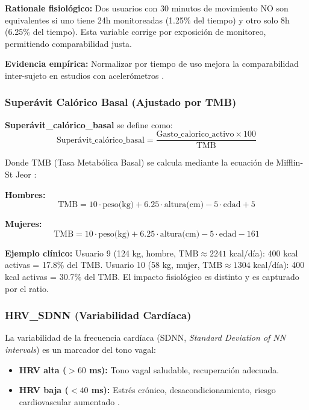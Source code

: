 \documentclass[12pt,a4paper,twoside]{article}
\newcommand{\TMB}{\mathrm{TMB}}
\begin{document}
\textbf{Rationale fisiológico:} Dos usuarios con 30 minutos de movimiento NO son equivalentes si uno tiene 24h monitoreadas (1.25\% del tiempo) y otro solo 8h (6.25\% del tiempo). Esta variable corrige por exposición de monitoreo, permitiendo comparabilidad justa.

\textbf{Evidencia empírica:} Normalizar por tiempo de uso mejora la comparabilidad inter-sujeto en estudios con acelerómetros \citep{Troiano2008,TudorLocke2011}.

\subsubsection{Superávit Calórico Basal (Ajustado por TMB)}

\begin{definicion}
\textbf{Superávit\_calórico\_basal} se define como:
\begin{equation}
\text{Superávit\_calórico\_basal} = \frac{\text{Gasto\_calorico\_activo} \times 100}{\TMB}
\end{equation}

Donde $\TMB$ (Tasa Metabólica Basal) se calcula mediante la ecuación de Mifflin-St Jeor \citep{Mifflin1990}:

\textbf{Hombres:}
\begin{equation}
\TMB = 10 \cdot \text{peso(kg)} + 6.25 \cdot \text{altura(cm)} - 5 \cdot \text{edad} + 5
\end{equation}

\textbf{Mujeres:}
\begin{equation}
\TMB = 10 \cdot \text{peso(kg)} + 6.25 \cdot \text{altura(cm)} - 5 \cdot \text{edad} - 161
\end{equation}
\end{definicion}

\textbf{Ejemplo clínico:} Usuario 9 (124 kg, hombre, $\TMB \approx 2241$ kcal/día): 400 kcal activas = 17.8\% del TMB. Usuario 10 (58 kg, mujer, $\TMB \approx 1304$ kcal/día): 400 kcal activas = 30.7\% del TMB. El impacto fisiológico es distinto y es capturado por el ratio.

\subsubsection{HRV\_SDNN (Variabilidad Cardíaca)}

La variabilidad de la frecuencia cardíaca (SDNN, \textit{Standard Deviation of NN intervals}) es un marcador del tono vagal:
\begin{itemize}
    \item \textbf{HRV alta ($>60$ ms):} Tono vagal saludable, recuperación adecuada.
    \item \textbf{HRV baja ($<40$ ms):} Estrés crónico, desacondicionamiento, riesgo cardiovascular aumentado \citep{Thayer2010,TaskForce1996}.
\end{itemize}
\end{document}
